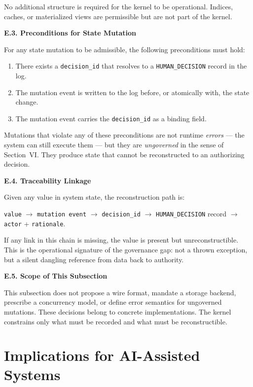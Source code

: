 \documentclass[conference]{IEEEtran}
\begin{document}
No additional structure is required for the kernel to be operational. Indices, caches, or materialized views are permissible but are not part of the kernel.

\noindent\textbf{E.3. Preconditions for State Mutation}

For any state mutation to be admissible, the following preconditions must hold:

\begin{enumerate}
  \item There exists a \texttt{decision\_id} that resolves to a \texttt{HUMAN\_DECISION} record in the log.
  \item The mutation event is written to the log before, or atomically with, the state change.
  \item The mutation event carries the \texttt{decision\_id} as a binding field.
\end{enumerate}

Mutations that violate any of these preconditions are not runtime \emph{errors} --- the system can still execute them --- but they are \emph{ungoverned} in the sense of Section~VI. They produce state that cannot be reconstructed to an authorizing decision.

\noindent\textbf{E.4. Traceability Linkage}

Given any value in system state, the reconstruction path is:

\medskip
\noindent\texttt{value} $\rightarrow$ \texttt{mutation event} $\rightarrow$ \texttt{decision\_id} $\rightarrow$ \texttt{HUMAN\_DECISION} record $\rightarrow$ \texttt{actor} + \texttt{rationale}.

\medskip
If any link in this chain is missing, the value is present but unreconstructible. This is the operational signature of the governance gap: not a thrown exception, but a silent dangling reference from data back to authority.

\noindent\textbf{E.5. Scope of This Subsection}

This subsection does not propose a wire format, mandate a storage backend, prescribe a concurrency model, or define error semantics for ungoverned mutations. These decisions belong to concrete implementations. The kernel constrains only what must be recorded and what must be reconstructible.

\section{Implications for AI-Assisted Systems}
\end{document}
